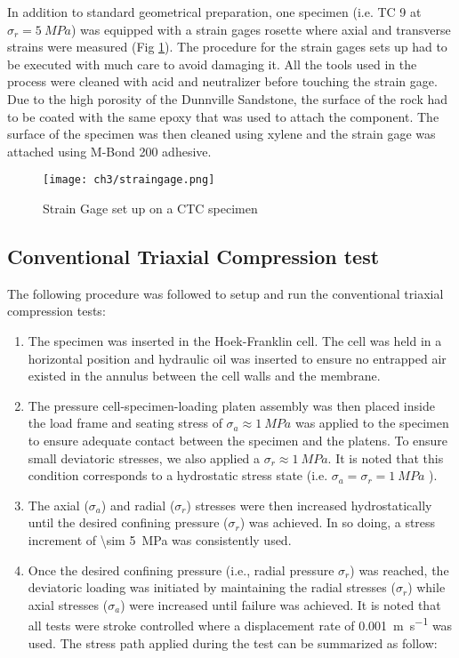 In addition to standard geometrical preparation, one specimen (i.e. TC 9 at $\sigma_r = \SI{5}{MPa}$) was equipped with a strain gages rosette where axial and transverse strains were measured (Fig \ref{fig3:7}). The procedure for the strain gages sets up had to be executed with much care to avoid damaging it. All the tools used in the process were cleaned with acid and neutralizer before touching the strain gage. Due to the high porosity of the Dunnville Sandstone, the surface of the rock had to be coated with the same epoxy that was used to attach the component. The surface of the specimen was then cleaned using xylene and the strain gage was attached using M-Bond 200 adhesive.

\begin{figure}[tb]
    \centering
    \texttt{[image: ch3/straingage.png]}
    \caption{Strain Gage set up on a CTC specimen}
    \label{fig3:7}
\end{figure} 

\subsection{Conventional Triaxial Compression test} \label{ch3:Conventional-Triaxial-Compression-test}

The following procedure was followed to setup and run the conventional triaxial compression tests:

\begin{enumerate}
    \item The specimen was inserted in the Hoek-Franklin cell. The cell was held in a horizontal position and hydraulic oil was inserted to ensure no entrapped air existed in the annulus between the cell walls and the membrane.
    \item The pressure cell-specimen-loading platen assembly was then placed inside the load frame and seating stress of  $\sigma_a \approx \SI{1}{MPa}$ was applied to the specimen to ensure adequate contact between the specimen and the platens. To ensure small deviatoric stresses, we also applied a $\sigma_r \approx \SI{1}{MPa}$. It is noted that this condition corresponds to a hydrostatic stress state (i.e. $\sigma_a = \sigma_r = \SI{1}{MPa}$ ).
    \item The axial ($\sigma_a$) and radial ($\sigma_r$) stresses were then increased hydrostatically until the desired confining pressure ($\sigma_r$) was achieved. In so doing, a stress increment of \SI{\sim 5}{MPa} was consistently used.
    \item Once the desired confining pressure (i.e., radial pressure $\sigma_r$) was reached, the deviatoric loading was initiated by maintaining the radial stresses ($\sigma_r$) while axial stresses ($\sigma_a$) were increased until failure was achieved. It is noted that all tests were stroke controlled where a displacement rate of \SI{0.001}{\meter\per\second} was used. The stress path applied during the test can be summarized as follow:
\end{enumerate}

